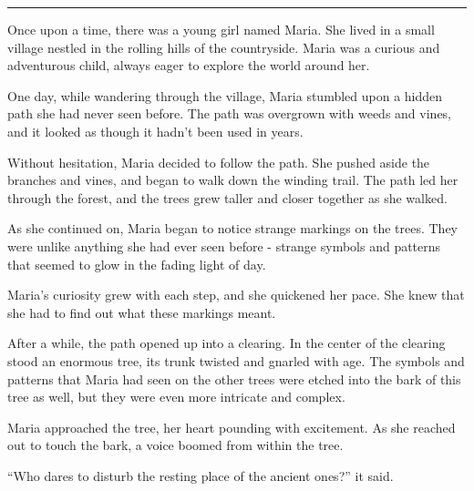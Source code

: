 \documentclass[a4paper]{article}
\begin{document}
\begin{story}[!h]
\sffamily
\small
\hrule
\vspace{1ex}
Once upon a time, there was a young girl named Maria. She lived in a small village nestled in the rolling hills of the countryside. Maria was a curious and adventurous child, always eager to explore the world around her.
\vspace{1ex}

\hspace{10pt} One day, while wandering through the village, Maria stumbled upon a hidden path she had never seen before. The path was overgrown with weeds and vines, and it looked as though it hadn't been used in years.
\vspace{1ex}

\hspace{10pt} Without hesitation, Maria decided to follow the path. She pushed aside the branches and vines, and began to walk down the winding trail. The path led her through the forest, and the trees grew taller and closer together as she walked.
\vspace{1ex}

\hspace{10pt} As she continued on, Maria began to notice strange markings on the trees. They were unlike anything she had ever seen before - strange symbols and patterns that seemed to glow in the fading light of day.
\vspace{1ex}

\hspace{10pt} Maria's curiosity grew with each step, and she quickened her pace. She knew that she had to find out what these markings meant.
\vspace{1ex}

\hspace{10pt} After a while, the path opened up into a clearing. In the center of the clearing stood an enormous tree, its trunk twisted and gnarled with age. The symbols and patterns that Maria had seen on the other trees were etched into the bark of this tree as well, but they were even more intricate and complex.
\vspace{1ex}

\hspace{10pt} Maria approached the tree, her heart pounding with excitement. As she reached out to touch the bark, a voice boomed from within the tree.
\vspace{1ex}

\hspace{10pt} ``Who dares to disturb the resting place of the ancient ones?'' it said.
\vspace{1ex}


\end{story}
\end{document}
